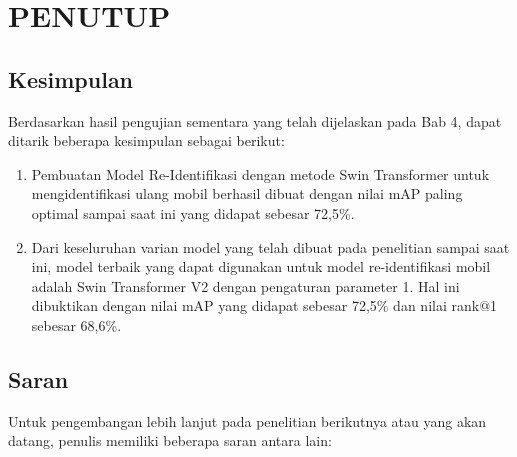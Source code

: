 \chapter{PENUTUP}
\label{chap:penutup}


\section{Kesimpulan}
\label{sec:kesimpulan}

Berdasarkan hasil pengujian sementara yang telah dijelaskan pada Bab 4, dapat 
ditarik beberapa kesimpulan sebagai berikut:

\begin{enumerate}[nolistsep]

  \item Pembuatan Model Re-Identifikasi dengan metode Swin Transformer untuk 
  mengidentifikasi ulang mobil berhasil dibuat dengan nilai mAP paling optimal sampai 
  saat ini yang didapat sebesar 72,5\%.

  \item Dari keseluruhan varian model yang telah dibuat pada penelitian sampai saat ini, 
  model terbaik yang dapat digunakan untuk model re-identifikasi mobil adalah 
  Swin Transformer V2 dengan pengaturan parameter 1. Hal ini dibuktikan dengan nilai 
  mAP yang didapat sebesar 72,5\% dan nilai rank@1 sebesar 68,6\%.


\end{enumerate}

\section{Saran}
\label{chap:saran}

Untuk pengembangan lebih lanjut pada penelitian berikutnya atau yang akan datang, \linebreak
penulis memiliki beberapa saran antara lain:





